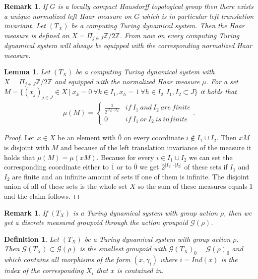 \documentclass[12pt,a4paper]{scrartcl}
\newtheorem{Definition}[Theorem]{Definition}
\newtheorem{Lemma}[Theorem]{Lemma}
\newtheorem{Remark}[Theorem]{Remark}
\numberwithin{equation}{section}
\newcommand{\2}{\mathbb{Z} / 2 \mathbb{Z}}
\newcommand{\G}{\mathcal{G}}
\newcommand{\1}{\bar{1}}
\newcommand{\0}{\bar{0}}
\begin{document}
\begin{Remark}
	If $G$ is a locally compact Hausdorff topological group then there exists a unique normalized left Haar measure on $G$ which is in particular left translation invariant. Let $(T_X)$ be a computing Turing dynamical system. Then the Haar measure is defined on $X = \Pi_{j \in J} \2$. From now on every computing Turing dynamical system will always be equipped with the corresponding normalized Haar measure.
\end{Remark}
\begin{Lemma}
	Let $(T_X)$ be a computing Turing dynamical system with $X = \Pi_{j \in J} \2$ and equipped with the normalized Haar measure $\mu$. For a set $M = \{(x_j)_{j \in J} \in X \ | \ x_k = 0 \ \forall k \in I_1, x_h = 1 \ \forall h \in I_2\, \ I_1, I_2 \subset J \}$ it holds that
	\begin{align*}
		\mu (M) = \begin{cases}
		\frac{1}{2^{|I_1| \cdot |I_2|}} & if \ I_1 \ and \ I_2 \ are \ finite \\
		0 & if \ I_1 \ or \ I_2 \ is \ infinite
		\end{cases}.
	\end{align*}
\end{Lemma}
\begin{proof}
	Let $x \in X$ be an element with $\overline{0}$ on every coordinate $i \notin I_1 \cup I_2$. Then $xM$ is disjoint with $M$ and because of the left translation invariance of the measure it holds that $\mu (M) = \mu (xM)$. Because for every $i \in I_1 \cup I_2$ we can set the corresponding coordinate either to $\overline{1}$ or to $\overline{0}$ we get $2^{|I_1| \cdot |I_2|}$ of these sets if $I_1$ and $I_2$ are finite and an infinite amount of sets if one of them is infinite. The disjoint union of all of these sets is the whole set $X$ so the sum of these measures equals 1 and the claim follows.
\end{proof}
\begin{Remark}
	If $(T_X)$ is a Turing dynamical system with group action $\rho$, then we get a discrete measured groupoid through the action groupoid $\G(\rho)$.
\end{Remark}
\begin{Definition}
	Let $(T_X)$ be a Turing dynamical system with group action $\rho$. Then $\G (T_X) \subset \G(\rho)$ is the smallest groupoid with $\G (T_X)_0 = \G(\rho)_0$ and which contains all morphisms of the form $(x, \gamma_i)$ where $i = Ind(x)$ is the index of the corresponding $X_i$ that $x$ is contained in.
\end{Definition}
\end{document}
